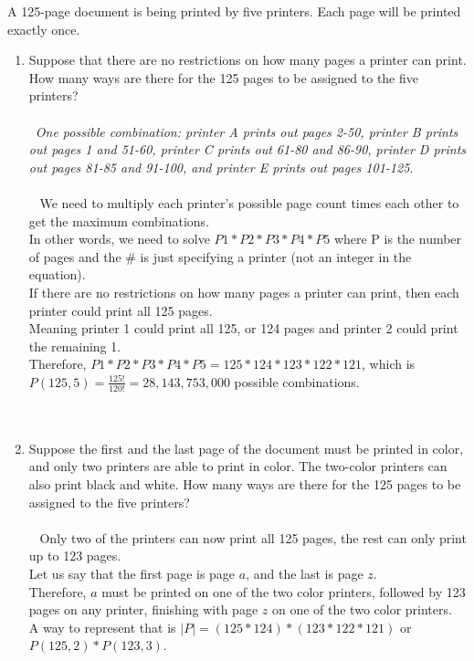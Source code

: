 \documentclass{amsart}
\theoremstyle{definition}
\theoremstyle{Exercise}
\theoremstyle{remark}
\theoremstyle{rule}
\numberwithin{equation}{section}
\begin{document}
A 125-page document is being printed by five printers. Each page will be printed exactly once.
 \begin{enumerate}[label=(\alph*)]
 \item  Suppose that there are no restrictions on how many pages a printer can print.
 How many ways are there for the 125 pages to be assigned to the five printers?\\\\\
{\it One possible combination: printer A prints out pages 2-50, printer B prints out pages 1 and 51-60, printer C prints out 61-80 and 86-90, printer D prints out pages 81-85 and 91-100, and printer E prints out pages 101-125.}\\\\\
We need to multiply each printer's possible page count times each other to get the maximum combinations.\\
In other words, we need to solve $P1*P2*P3*P4*P5$ where P is the number of pages and the \# is just specifying a printer (not an integer in the equation).\\
If there are no restrictions on how many pages a printer can print, then each printer could print all 125 pages.\\
Meaning printer 1 could print all 125, or 124 pages and printer 2 could print the remaining 1.\\
Therefore, $P1*P2*P3*P4*P5 = 125 * 124 * 123 * 122 * 121$, which is $P(125,5) = \frac{125!}{120!} = 28,143,753,000$ possible combinations.
        \\\\\
 \item Suppose the first and the last page of the document must be printed in color, and only two printers are able to print in color. The two-color printers can also print black and white. How many ways are there for the 125 pages to be assigned to the five printers?\\\\\
Only two of the printers can now print all 125 pages, the rest can only print up to 123 pages.\\
Let us say that the first page is page $a$, and the last is page $z$.\\
Therefore, $a$ must be printed on one of the two color printers, followed by 123 pages on any printer, finishing with page $z$ on one of the two color printers.\\
A way to represent that is $|P| = (125 * 124) * (123 * 122 * 121)$ or $P(125,2) * P(123,3)$.\\

\end{enumerate}
\end{document}
